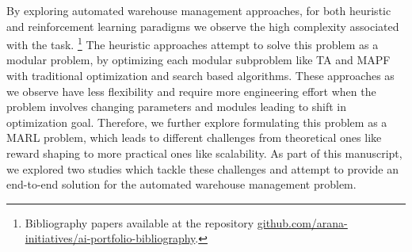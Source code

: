 \documentclass{article}
\begin{document}
By exploring automated warehouse management approaches, for both heuristic and reinforcement learning paradigms we observe the high complexity associated with the task.
\footnote{Bibliography papers available at the repository \href{https://github.com/arana-initiatives/ai-portfolio-bibliography}{github.com/arana-initiatives/ai-portfolio-bibliography}.}
The heuristic approaches attempt to solve this problem as a modular problem, by optimizing each modular subproblem like TA and MAPF with traditional optimization and search based algorithms.
These approaches as we observe have less flexibility and require more engineering effort when the problem involves changing parameters and modules leading to shift in optimization goal.
Therefore, we further explore formulating this problem as a MARL problem, which leads to different challenges from theoretical ones like reward shaping to more practical ones like scalability.
As part of this manuscript, we explored two studies which tackle these challenges and attempt to provide an end-to-end solution for the automated warehouse management problem.
\end{document}
